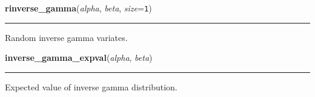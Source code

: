     \label{pymc:distributions:rinverse_gamma}

    \vspace{0.5ex}

    \begin{boxedminipage}{\textwidth}

    \raggedright \textbf{rinverse\_gamma}(\textit{alpha}, \textit{beta}, \textit{size}=\texttt{1})

    \vspace{-1.5ex}

    \rule{\textwidth}{0.5\fboxrule}

Random inverse gamma variates.
    \vspace{1ex}

    \end{boxedminipage}

    \label{pymc:distributions:inverse_gamma_expval}

    \vspace{0.5ex}

    \begin{boxedminipage}{\textwidth}

    \raggedright \textbf{inverse\_gamma\_expval}(\textit{alpha}, \textit{beta})

    \vspace{-1.5ex}

    \rule{\textwidth}{0.5\fboxrule}

Expected value of inverse gamma distribution.
    \vspace{1ex}

    \end{boxedminipage}

    \label{pymc:distributions:inverse_gamma_like}

    \vspace{0.5ex}

